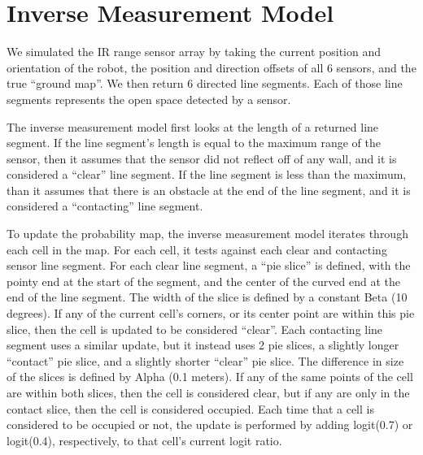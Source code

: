 \documentclass[12pt]{article}
\begin{document}


\newpage
\singlespacing
{}
\section{Inverse Measurement Model}
\setlength{\parindent}{1cm}

We simulated the IR range sensor array by taking the current position and orientation of the robot, the position and direction offsets of all 6 sensors, and the true “ground map”. We then return 6 directed line segments. Each of those line segments represents the open space detected by a sensor.

The inverse measurement model first looks at the length of a returned line segment. If the line segment’s length is equal to the maximum range of the sensor, then it assumes that the sensor did not reflect off of any wall, and it is considered a “clear” line segment. If the line segment is less than the maximum, than it assumes that there is an obstacle at the end of the line segment, and it is considered a “contacting” line segment.

To update the probability map, the inverse measurement model iterates through each cell in the map. For each cell, it tests against each clear and contacting sensor line segment.
For each clear line segment, a “pie slice” is defined, with the pointy end at the start of the segment, and the center of the curved end at the end of the line segment. The width of the slice is defined by a constant Beta (10 degrees). If any of the current cell’s corners, or its center point are within this pie slice, then the cell is updated to be considered “clear”.
Each contacting line segment uses a similar update, but it instead uses 2 pie slices, a slightly longer “contact” pie slice, and a slightly shorter “clear” pie slice. The difference in size of the slices is defined by Alpha (0.1 meters). If any of the same points of the cell are within both slices, then the cell is considered clear, but if any are only in the contact slice, then the cell is considered occupied.
Each time that a cell is considered to be occupied or not, the update is performed by adding logit(0.7) or logit(0.4), respectively, to that cell’s current logit ratio.
\end{document}
